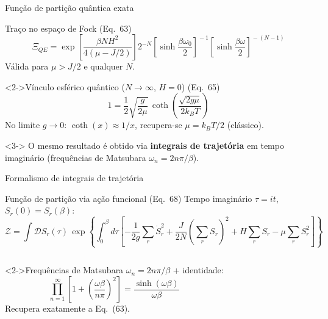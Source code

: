 \documentclass[10pt,aspectratio=169]{beamer}
\newcommand{\eq}[1]{\textcolor{qcdBlue!70!black}{\small(#1)}}
\begin{document}
\begin{frame}{Função de partição quântica exata}
  \begin{block}{Traço no espaço de Fock \eq{Eq.~63}}
    \[\Xi_{QE} =
      \exp\!\left[\frac{\beta N H^2}{4(\mu-J/2)}\right]
      2^{-N}\!\left[\sinh\!\frac{\beta\omega_0}{2}\right]^{\!-1}
      \!\!\left[\sinh\!\frac{\beta\omega}{2}\right]^{\!-(N-1)}
    \]
    Válida para $\mu>J/2$ e qualquer $N$.
  \end{block}
  \begin{block}<2->{Vínculo esférico quântico ($N\to\infty$, $H=0$) \eq{Eq.~65}}
    \[
      1 = \frac{1}{2}\!\sqrt{\frac{g}{2\mu}}\,\coth\!\left(\frac{\sqrt{2g\mu}}{2k_BT}\right)
    \]
    No limite $g\to0$: $\coth(x)\approx 1/x$, recupera-se $\mu=k_BT/2$ (clássico).
  \end{block}
  \begin{exampleblock}<3->{}
    \centering
    O mesmo resultado é obtido via \textbf{integrais de trajetória} em tempo imaginário
    (frequências de Matsubara $\omega_n=2n\pi/\beta$).
  \end{exampleblock}
\end{frame}

\begin{frame}{Formalismo de integrais de trajetória}
  \begin{block}{Função de partição via ação funcional \eq{Eq.~68}}
    Tempo imaginário $\tau=it$, $S_r(0)=S_r(\beta)$:
    \[\mathcal{Z}=\int\!\mathcal{D}S_r(\tau)\,
      \exp\!\left\{\int_0^\beta\!d\tau\left[
        -\frac{1}{2g}\sum_r\!\dot{S}_r^2
        +\frac{J}{2N}\!\left(\sum_r S_r\right)^{\!2}
        +H\!\sum_r S_r-\mu\!\sum_r S_r^2\right]\right\}\]
  \end{block}
  \begin{columns}[c]
    \begin{block}<2->{Frequências de Matsubara}
      $\omega_n=2n\pi/\beta$ + identidade:
      \[\prod_{n=1}^\infty\!\left[1+\!\left(\frac{\omega\beta}{n\pi}\right)^{\!2}\right]
        =\frac{\sinh(\omega\beta)}{\omega\beta}\]
      Recupera exatamente a Eq.~(63).
    \end{block}
  \end{columns}
\end{frame}
\end{document}
